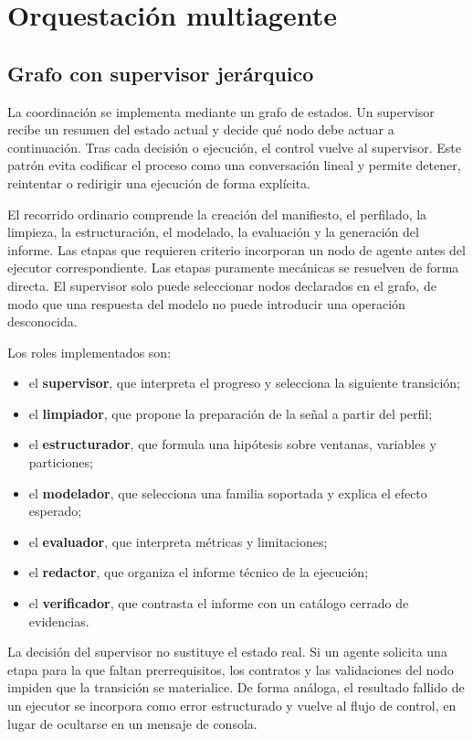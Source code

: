 \section{Orquestación multiagente}

\subsection{Grafo con supervisor jerárquico}

La coordinación se implementa mediante un grafo de estados. Un supervisor
recibe un resumen del estado actual y decide qué nodo debe actuar a
continuación. Tras cada decisión o ejecución, el control vuelve al supervisor.
Este patrón evita codificar el proceso como una conversación lineal y permite
detener, reintentar o redirigir una ejecución de forma explícita.

El recorrido ordinario comprende la creación del manifiesto, el perfilado, la
limpieza, la estructuración, el modelado, la evaluación y la generación del
informe. Las etapas que requieren criterio incorporan un nodo de agente antes
del ejecutor correspondiente. Las etapas puramente mecánicas se resuelven de
forma directa. El supervisor solo puede seleccionar nodos declarados en el
grafo, de modo que una respuesta del modelo no puede introducir una operación
desconocida.

Los roles implementados son:

\begin{itemize}
  \item el \textbf{supervisor}, que interpreta el progreso y selecciona la siguiente transición;
  \item el \textbf{limpiador}, que propone la preparación de la señal a partir del perfil;
  \item el \textbf{estructurador}, que formula una hipótesis sobre ventanas, variables y particiones;
  \item el \textbf{modelador}, que selecciona una familia soportada y explica el efecto esperado;
  \item el \textbf{evaluador}, que interpreta métricas y limitaciones;
  \item el \textbf{redactor}, que organiza el informe técnico de la ejecución;
  \item el \textbf{verificador}, que contrasta el informe con un catálogo cerrado de evidencias.
\end{itemize}

La decisión del supervisor no sustituye el estado real. Si un agente solicita
una etapa para la que faltan prerrequisitos, los contratos y las validaciones
del nodo impiden que la transición se materialice. De forma análoga, el
resultado fallido de un ejecutor se incorpora como error estructurado y vuelve
al flujo de control, en lugar de ocultarse en un mensaje de consola.

